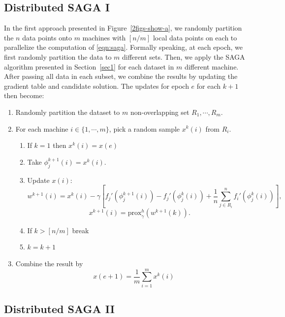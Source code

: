 \documentclass[a4paper,11pt]{article}
\newcommand{\prox}{\textrm{prox}}
\begin{document}
\subsection{Distributed SAGA I}
In the first approach presented in Figure~\ref{2figs-show-a}, we randomly partition the $n$ data points onto $m$ machines with $[n/m]$ local data points on each to parallelize the computation of \eqref{eqn:saga}. Formally speaking, at each epoch, we first randomly partition the data to $m$ different sets. Then, we apply the SAGA algorithm presented in Section~\ref{sec1} for each dataset in $m$ different machine. After passing all data in each subset, we combine the results by updating the gradient table and candidate solution. The updates for epoch $e$ for each $k+1$ then become:
\begin{enumerate}
	\item Randomly partition the dataset to $m$ non-overlapping set $R_1, \cdots, R_m$.
	\item For each machine $i \in \{ 1, \cdots, m \}$, pick a random sample $x^k(i)$ from $R_i$.
	\begin{enumerate}
		\item If $ k = 1 $ then $x^k(i) = x(e)$
		\item Take $\phi_j^{k+1}(i) = x^k(i)$.
		\item Update $x(i)$:
		\begin{equation} \label{eqn:distsaga1}
			w^{k+1}(i) = x^k(i) - \gamma \left[ f_j'(\phi_j^{k+1}(i)) - f_j'(\phi_j^k(i))
			+ \frac1n \sum_{j \in R_i}^n f_i'(\phi_j^k(i)) \right] ,
		\end{equation}
		$$x^{k+1}(i) = \prox_\gamma^h (w^{k+1}(k)).$$
		\item If $ k > [n/m]$ break
		\item $k = k+1$
	\end{enumerate}	
	\item Combine the result by
	$$ x(e+1) = \frac{1}{m} \sum_{i=1}^m x^k(i) $$
\end{enumerate}

\subsection{Distributed SAGA II}
\end{document}
